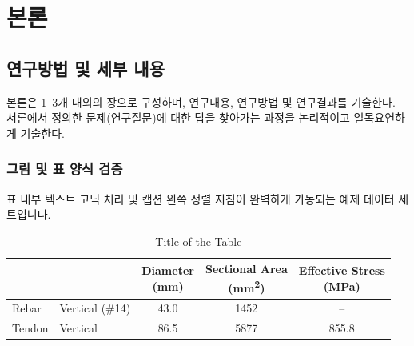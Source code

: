   \chapter{본\quad 론}
  \section{연구방법 및 세부 내용}
  본론은 1~3개 내외의 장으로 구성하며, 연구내용, 연구방법 및 연구결과를 기술한다. 
  서론에서 정의한 문제(연구질문)에 대한 답을 찾아가는 과정을 논리적이고 일목요연하게 기술한다.

  \subsection{그림 및 표 양식 검증}
  표 내부 텍스트 고딕 처리 및 캡션 왼쪽 정렬 지침이 완벽하게 가동되는 예제 데이터 세트입니다.

  \begin{table}[htbp]
    \caption{Title of the Table}
    \label{tab:sample_table}
    \centering
    \setlength{\tabcolsep}{10pt}
    \setlength{\extrarowheight}{6pt}
    \begin{tabular}{l|l|c|c|c}
      \hline
      \multicolumn{2}{l|}{} & \makecell{\textbf{Diameter}\\\textbf{(mm)}} & \makecell{\textbf{Sectional Area}\\\textbf{(mm\textsuperscript{2})}} & \makecell{\textbf{Effective Stress}\\\textbf{(MPa)}} \\ \hline
      Rebar  & Vertical (\#14) & 43.0 & 1452 & -- \\[4pt] \hline
      Tendon & Vertical        & 86.5 & 5877 & 855.8 \\[4pt] \hline
    \end{tabular}
  \end{table}